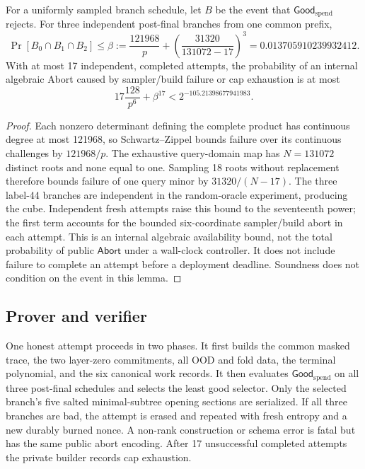 \begin{lemma}
\label{lem:goodspend-product}
For a uniformly sampled branch schedule, let \(B\) be the event that
\(\mathsf{Good}_{\mathrm{spend}}\) rejects.  For three independent post-final branches
from one common prefix,
\[
 \Pr[B_0\cap B_1\cap B_2]\le
 \beta:=\frac{121968}{p}+
 \left(\frac{31320}{131072-17}\right)^3
 =0.013705910239932412.
\]
With at most 17 independent, completed attempts, the probability of an
internal algebraic Abort caused by sampler/build failure or cap exhaustion is
at most
\[
  17\frac{128}{p^6}+\beta^{17}
  <2^{-105.21398677941983}.
\]
\end{lemma}

\begin{proof}
Each nonzero determinant defining the complete product has continuous degree
at most 121968, so Schwartz--Zippel bounds failure over its continuous
challenges by \(121968/p\).  The exhaustive query-domain map has
\(N=131072\) distinct roots and none equal to one.  Sampling 18 roots without
replacement therefore bounds failure of one query minor by
\(31320/(N-17)\).  The three label-44 branches are independent in the
random-oracle experiment, producing the cube.  Independent fresh attempts
raise this bound to the seventeenth power; the first term accounts for the
bounded six-coordinate sampler/build abort in each attempt.  This is an
internal algebraic availability bound, not the total probability of public
\(\mathsf{Abort}\) under a wall-clock controller.  It does not include failure
to complete an attempt before a deployment deadline.  Soundness does not
condition on the event in this lemma.
\end{proof}

\subsection{Prover and verifier}

One honest attempt proceeds in two phases.  It first builds the common masked
trace, the two layer-zero commitments, all OOD and fold data, the terminal
polynomial, and the six canonical work records.  It then evaluates
\(\mathsf{Good}_{\mathrm{spend}}\) on all three post-final schedules and selects the least
good selector.  Only the selected branch's five salted minimal-subtree
opening sections are serialized.  If all three branches are bad, the attempt
is erased and repeated with fresh entropy and a new durably burned nonce.  A
non-rank construction or schema error is fatal but has the same public abort
encoding.  After 17 unsuccessful completed attempts the private builder
records cap exhaustion.

